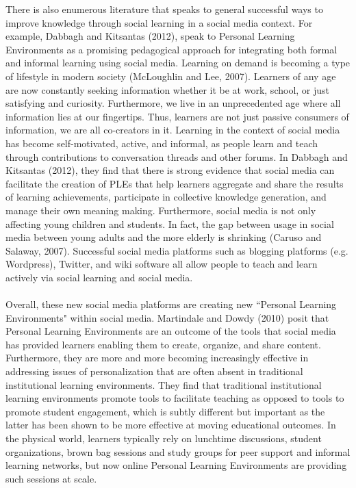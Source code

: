 \documentclass[12pt, final]{article}
\begin{document}
There is also enumerous literature that speaks to general successful ways to improve knowledge through social learning in a social media context. For example, Dabbagh and Kitsantas (2012), speak to Personal Learning Environments as a promising pedagogical approach for integrating both formal and informal learning using social media. Learning on demand is becoming a type of lifestyle in modern society (McLoughlin and Lee, 2007). Learners of any age are now constantly seeking information whether it be at work, school, or just satisfying and curiosity. Furthermore, we live in an unprecedented age where all information lies at our fingertips. Thus, learners are not just passive consumers of information, we are all co-creators in it. Learning in the context of social media has become self-motivated, active, and informal, as people learn and teach through contributions to conversation threads and other forums. In Dabbagh and Kitsantas (2012), they find that there is strong evidence that social media can facilitate the creation of PLEs that help learners aggregate and share the results of learning achievements, participate in collective knowledge generation, and manage their own meaning making. Furthermore, social media is not only affecting young children and students. In fact, the gap between usage in social media between young adults and the more elderly is shrinking (Caruso and Salaway, 2007). Successful social media platforms such as blogging platforms (e.g. Wordpress), Twitter, and wiki software all allow people to teach and learn actively via social learning and social media. 
\\
\\
Overall, these new social media platforms are creating new ``Personal Learning Environments" within social media. Martindale and Dowdy (2010) posit that Personal Learning Environments are an outcome of the tools that social media has provided learners enabling them to create, organize, and share content. Furthermore, they are more and more becoming increasingly effective in addressing issues of personalization that are often absent in traditional institutional learning environments. They find that traditional institutional learning environments promote tools to facilitate teaching as opposed to tools to promote student engagement, which is subtly different but important as the latter has been shown to be more effective at moving educational outcomes. In the physical world, learners typically rely on lunchtime discussions, student organizations, brown bag sessions and study groups for peer support and informal learning networks, but now online Personal Learning Environments are providing such sessions at scale. 
\end{document}
